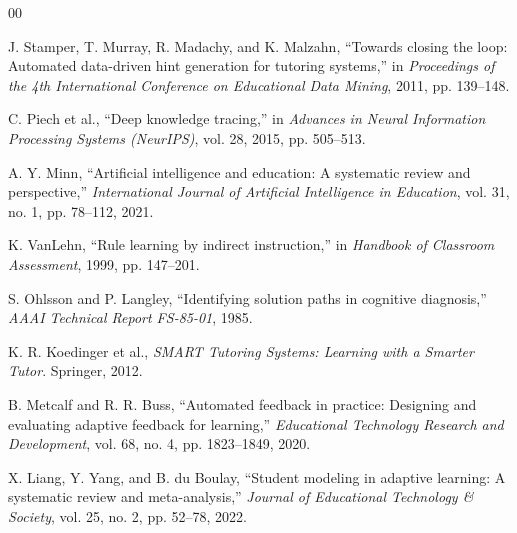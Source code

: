 \documentclass[conference]{IEEEtran}
\begin{document}
\begin{thebibliography}{00}

 J. Stamper, T. Murray, R. Madachy, and K. Malzahn, ``Towards closing the loop: Automated data-driven hint generation for tutoring systems,'' in \textit{Proceedings of the 4th International Conference on Educational Data Mining}, 2011, pp. 139--148.

 C. Piech et al., ``Deep knowledge tracing,'' in \textit{Advances in Neural Information Processing Systems (NeurIPS)}, vol. 28, 2015, pp. 505--513.

 A. Y. Minn, ``Artificial intelligence and education: A systematic review and perspective,'' \textit{International Journal of Artificial Intelligence in Education}, vol. 31, no. 1, pp. 78--112, 2021.

 K. VanLehn, ``Rule learning by indirect instruction,'' in \textit{Handbook of Classroom Assessment}, 1999, pp. 147--201.

 S. Ohlsson and P. Langley, ``Identifying solution paths in cognitive diagnosis,'' \textit{AAAI Technical Report FS-85-01}, 1985.

 K. R. Koedinger et al., \textit{SMART Tutoring Systems: Learning with a Smarter Tutor}. Springer, 2012.

 B. Metcalf and R. R. Buss, ``Automated feedback in practice: Designing and evaluating adaptive feedback for learning,'' \textit{Educational Technology Research and Development}, vol. 68, no. 4, pp. 1823--1849, 2020.

 X. Liang, Y. Yang, and B. du Boulay, ``Student modeling in adaptive learning: A systematic review and meta-analysis,'' \textit{Journal of Educational Technology \& Society}, vol. 25, no. 2, pp. 52--78, 2022.

\end{thebibliography}
\end{document}
